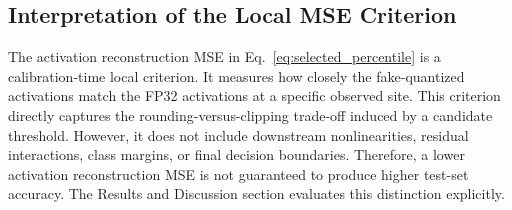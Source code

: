 \subsection{Interpretation of the Local MSE Criterion}
\label{subsec:mse_criterion_interpretation}

The activation reconstruction MSE in Eq.~\eqref{eq:selected_percentile} is a calibration-time local criterion. It measures how closely the fake-quantized activations match the FP32 activations at a specific observed site. This criterion directly captures the rounding-versus-clipping trade-off induced by a candidate threshold. However, it does not include downstream nonlinearities, residual interactions, class margins, or final decision boundaries. Therefore, a lower activation reconstruction MSE is not guaranteed to produce higher test-set accuracy. The Results and Discussion section evaluates this distinction explicitly.
